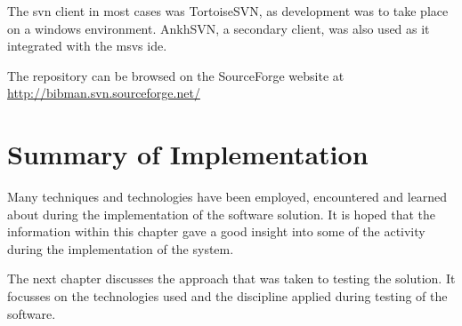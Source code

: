 The \gls{svn} client in most cases was TortoiseSVN, as development was to take place on a windows environment.  AnkhSVN, a secondary client, was also used as it integrated with the \gls{msvs} \gls{ide}. 

The repository can be browsed on the SourceForge website at \url{http://bibman.svn.sourceforge.net/}

\section{Summary of Implementation}
Many techniques and technologies have been employed, encountered and learned about during the implementation of the software solution.  It is hoped that the information within this chapter gave a good insight into some of the activity during the implementation of the system.

The next chapter discusses the approach that was taken to testing the solution. It focusses on the technologies used and the discipline applied during testing of the software.